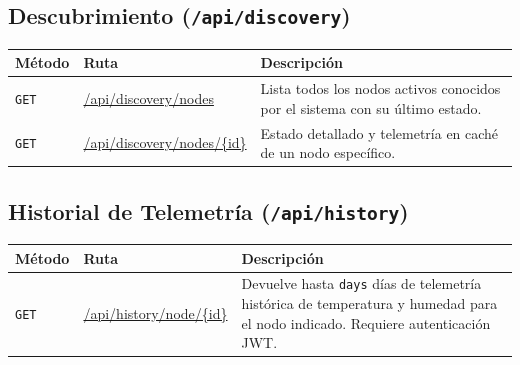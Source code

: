 \subsection{Descubrimiento (\texttt{/api/discovery})}
\begin{table}[H]
    \centering
    \begin{tabularx}{\textwidth}{lXX}
        \toprule
        \textbf{Método} & \textbf{Ruta}               & \textbf{Descripción} \\
        \midrule
        \texttt{GET}  & \url{/api/discovery/nodes} & Lista todos los nodos activos conocidos por el sistema con su último estado. \\
        \texttt{GET}  & \url{/api/discovery/nodes/{id}} & Estado detallado y telemetría en caché de un nodo específico. \\
        \bottomrule
    \end{tabularx}
\end{table}

\subsection{Historial de Telemetría (\texttt{/api/history})}
\begin{table}[H]
    \centering
    \begin{tabularx}{\textwidth}{lXX}
        \toprule
        \textbf{Método} & \textbf{Ruta}              & \textbf{Descripción} \\
        \midrule
        \texttt{GET}  & \url{/api/history/node/{id}} & Devuelve hasta \texttt{days} días de telemetría histórica de temperatura y humedad para el nodo indicado. Requiere autenticación JWT. \\
        \bottomrule
    \end{tabularx}
\end{table}

